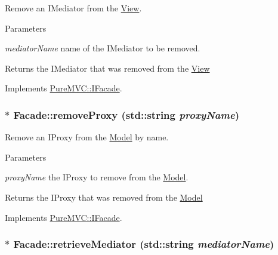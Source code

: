Remove an {\ttfamily IMediator} from the {\ttfamily \hyperlink{class_pure_m_v_c_1_1_view}{View}}. 
\begin{DoxyParams}{Parameters}
\item[{\em mediatorName}]name of the {\ttfamily IMediator} to be removed. \end{DoxyParams}
\begin{DoxyReturn}{Returns}
the {\ttfamily IMediator} that was removed from the {\ttfamily \hyperlink{class_pure_m_v_c_1_1_view}{View}} 
\end{DoxyReturn}


Implements \hyperlink{class_pure_m_v_c_1_1_i_facade_a216510b6052c29a37b810c3cbdeeca7c}{PureMVC::IFacade}.\hypertarget{class_pure_m_v_c_1_1_facade_a2cca0e7a4b11e905c2d4f5d7e0a545c1}{
\subsubsection[{removeProxy}]{ $\ast$ Facade::removeProxy (std::string {\em proxyName})}}
\label{class_pure_m_v_c_1_1_facade_a2cca0e7a4b11e905c2d4f5d7e0a545c1}


Remove an {\ttfamily IProxy} from the {\ttfamily \hyperlink{class_pure_m_v_c_1_1_model}{Model}} by name. 
\begin{DoxyParams}{Parameters}
\item[{\em proxyName}]the {\ttfamily IProxy} to remove from the {\ttfamily \hyperlink{class_pure_m_v_c_1_1_model}{Model}}. \end{DoxyParams}
\begin{DoxyReturn}{Returns}
the {\ttfamily IProxy} that was removed from the {\ttfamily \hyperlink{class_pure_m_v_c_1_1_model}{Model}} 
\end{DoxyReturn}


Implements \hyperlink{class_pure_m_v_c_1_1_i_facade_ad4bab4e894ac4acd0b0f790dda21e8fe}{PureMVC::IFacade}.\hypertarget{class_pure_m_v_c_1_1_facade_a4e821a5fcc6c2fa509742e88ca43dd2d}{
\subsubsection[{retrieveMediator}]{ $\ast$ Facade::retrieveMediator (std::string {\em mediatorName})}}
\label{class_pure_m_v_c_1_1_facade_a4e821a5fcc6c2fa509742e88ca43dd2d}


